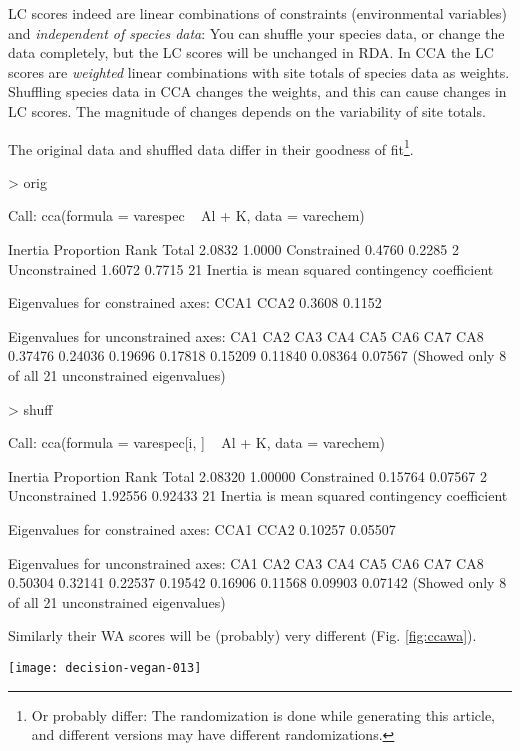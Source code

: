 \documentclass[a4paper,10pt]{amsart}
\begin{document}
LC scores indeed are linear combinations of constraints (environmental
variables) and \emph{independent of species data}: You can
shuffle your species data, or change the data completely, but the LC
scores will be unchanged in RDA.  In CCA the LC scores are
\emph{weighted} linear combinations with site totals of species data
as weights. Shuffling species data in CCA changes the weights, and
this can cause changes in LC scores.  The magnitude of changes depends
on the variability of site totals.

The original data and shuffled data differ in their goodness of
fit\footnote{Or probably differ: The randomization is done while
generating this article, and different versions may have different
randomizations.}.
\begin{Schunk}
\begin{Sinput}
> orig
\end{Sinput}
\begin{Soutput}
Call: cca(formula = varespec ~ Al + K, data = varechem)

              Inertia Proportion Rank
Total          2.0832     1.0000     
Constrained    0.4760     0.2285    2
Unconstrained  1.6072     0.7715   21
Inertia is mean squared contingency coefficient 

Eigenvalues for constrained axes:
  CCA1   CCA2 
0.3608 0.1152 

Eigenvalues for unconstrained axes:
    CA1     CA2     CA3     CA4     CA5     CA6     CA7     CA8 
0.37476 0.24036 0.19696 0.17818 0.15209 0.11840 0.08364 0.07567 
(Showed only 8 of all 21 unconstrained eigenvalues)
\end{Soutput}
\begin{Sinput}
> shuff
\end{Sinput}
\begin{Soutput}
Call: cca(formula = varespec[i, ] ~ Al + K, data = varechem)

              Inertia Proportion Rank
Total         2.08320    1.00000     
Constrained   0.15764    0.07567    2
Unconstrained 1.92556    0.92433   21
Inertia is mean squared contingency coefficient 

Eigenvalues for constrained axes:
   CCA1    CCA2 
0.10257 0.05507 

Eigenvalues for unconstrained axes:
    CA1     CA2     CA3     CA4     CA5     CA6     CA7     CA8 
0.50304 0.32141 0.22537 0.19542 0.16906 0.11568 0.09903 0.07142 
(Showed only 8 of all 21 unconstrained eigenvalues)
\end{Soutput}
\end{Schunk}
Similarly their WA scores will be (probably) very different
(Fig. \ref{fig:ccawa}).
\begin{SCfigure}
\texttt{[image: decision-vegan-013]}
\caption{Procrustes rotation of WA scores of CCA with the original and
  shuffled data.}
\label{fig:ccawa}
\end{SCfigure}
\end{document}
